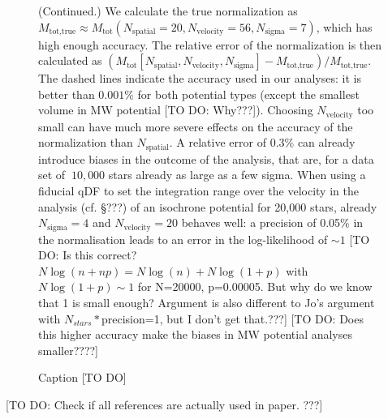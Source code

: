\documentclass[12pt,preprint]{aastex}
\begin{document}
\addtocounter{figure}{-1}
\begin{figure} [t!]
  \caption{(Continued.) We calculate the true normalization as $M_\text{tot,true} \approx M_\text{tot}(N_\text{spatial}=20,N_\text{velocity}=56,N_\text{sigma}=7)$, which has high enough accuracy. The relative error of the normalization is then calculated as $(M_\text{tot}[N_\text{spatial},N_\text{velocity},N_\text{sigma}] -  M_\text{tot,true} ) / M_\text{tot,true} $. The dashed lines indicate the accuracy used in our analyses: it is better than $0.001\%$ for both potential types (except the smallest volume in MW potential [TO DO: Why???]). Choosing $N_\text{velocity}$ too small can have much more severe effects on the accuracy of the normalization than $N_\text{spatial}$. A relative error of $0.3\%$ can already introduce biases in the outcome of the analysis, that are, for a data set of $~10,000$ stars already as large as a few sigma. When using a fiducial qDF to set the integration range over the velocity in the analysis  (cf. \S ???) of an isochrone potential for 20,000 stars, already $N_\text{sigma}=4$ and $N_\text{velocity}=20$ behaves well: a precision of 0.05\% in the normalisation leads to an error in the log-likelihood of $\sim1$ [TO DO: Is this correct? $N \log(n+np) = N\log(n) + N\log(1+p)$ with $N\log(1+p)\sim 1$ for N=20000, p=0.00005. But why do we know that 1 is small enough? Argument is also different to Jo's argument with $N_{stars}*$precision=1, but I don't get that.???]  [TO DO: Does this higher accuracy make the biases in MW potential analyses smaller????]}
\end{figure}


\begin{figure}
\caption{Caption [TO DO]} 
\end{figure}






[TO DO: Check if all references are actually used in paper. ???]
\end{document}
